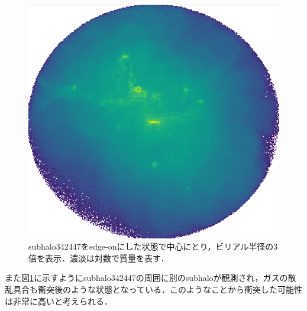 \begin{figure}[htbp]
	\centering
	\includegraphics[width=0.6\linewidth]{pic/virial3}
	\captionsetup{width=0.9\linewidth}
	\caption{subhalo342447をedge-onにした状態で中心にとり，ビリアル半径の3倍を表示．濃淡は対数で質量を表す．}
	\label{fig:virial3}
\end{figure}

また図\ref{fig:virial3}に示すようにsubhalo342447の周囲に別のsubhaloが観測され，ガスの散乱具合も衝突後のような状態となっている．このようなことから衝突した可能性は非常に高いと考えられる．